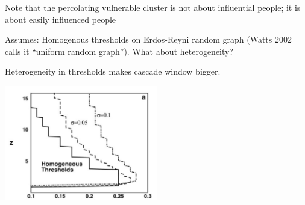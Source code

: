 \documentclass[aspectratio=169]{beamer}
\begin{document}
\begin{frame}

Note that the percolating vulnerable cluster is not about influential people; it is about easily influenced people

\end{frame}
%
%
%
%
%
\begin{frame}

Assumes: Homogenous thresholds on Erdos-Reyni random graph (Watts 2002 calls it ``uniform random graph'').  What about heterogeneity?

\end{frame}
\begin{frame}

Heterogeneity in thresholds makes cascade window bigger.

\begin{center}
\includegraphics[width=0.5\textwidth]{figures/watts_simple_2002_fig4a}
\end{center}

\end{frame}
\end{document}
